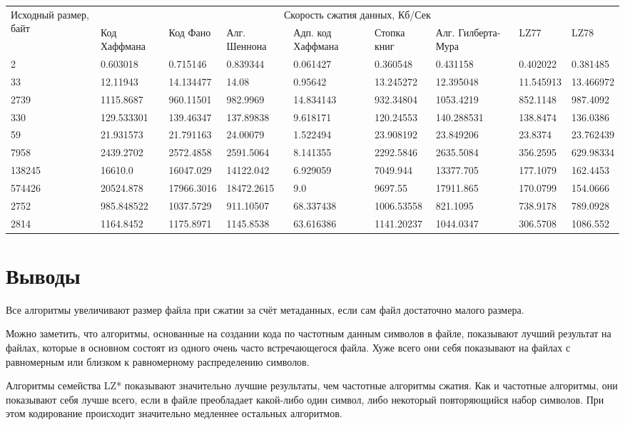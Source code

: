 \documentclass[a4paper,oneside]{article}
\theoremstyle{definition}
\begin{document}
\begin{table}[H]
  \small
  \centering
  \begin{tabular}{|p{1.5cm}|p{1.5cm}|p{1.5cm}|p{1.5cm}|p{1.5cm}|p{1.5cm}|p{1.5cm}|p{1.5cm}|p{1.5cm}|}
    \hline
    \multirow{2}{1.5cm}{Исходный размер, байт} & \multicolumn{8}{c|}{Скорость сжатия данных, Кб/Сек} \\ \cline{2-9}
    & Код Хаффмана & Код Фано & Алг. Шеннона & Адп. код Хаффмана &
    Стопка книг & Алг. Гилберта-Мура & LZ77 & LZ78 \\ \hline \hline

    2      & 0.603018 & 0.715146 & 0.839344 & 0.061427 & 0.360548 & 0.431158 & 0.402022 & 0.381485 \\ \hline
    33     & 12.11943 & 14.134477 & 14.08 & 0.95642 & 13.245272 & 12.395048 & 11.545913 & 13.466972 \\ \hline
    2739   & 1115.8687 & 960.11501 & 982.9969 & 14.834143 & 932.34804 & 1053.4219 & 852.1148 & 987.4092 \\ \hline
    330    & 129.533301 & 139.46347 & 137.89838 & 9.618171 & 120.24553 & 140.288531 & 138.8474 & 136.0386 \\ \hline
    59     & 21.931573 & 21.791163 & 24.00079 & 1.522494 & 23.908192 & 23.849206 & 23.8374 & 23.762439 \\ \hline
    7958   & 2439.2702 & 2572.4858 & 2591.5064 & 8.141355 & 2292.5846 & 2635.5084 & 356.2595 & 629.98334 \\ \hline
    138245 & 16610.0 & 16047.029 & 14122.042 & 6.929059 & 7049.944 & 13377.705 & 177.1079 & 162.4453 \\ \hline
    574426 & 20524.878 & 17966.3016 & 18472.2615 & 9.0 & 9697.55 & 17911.865 & 170.0799 & 154.0666 \\ \hline
    2752   & 985.848522 & 1037.5729 & 911.10507 & 68.337438 & 1006.53558 & 821.1095 & 738.9178 & 789.0928 \\ \hline
    2814   & 1164.8452 & 1175.8971 & 1145.8538 & 63.616386 & 1141.20237 & 1044.0347 & 306.5708 & 1086.552 \\ \hline
  \end{tabular}
\end{table}


\section{Выводы}

Все алгоритмы увеличивают размер файла при сжатии за счёт метаданных, если сам
файл достаточно малого размера.

Можно заметить, что алгоритмы, основанные на создании кода по частотным данным
символов в файле, показывают лучший результат на файлах, которые в основном
состоят из одного очень часто встречающегося файла. Хуже всего они себя
показывают на файлах с равномерным или близком к равномерному распределению
символов.

Алгоритмы семейства LZ* показывают значительно лучшие результаты, чем частотные
алгоритмы сжатия. Как и частотные алгоритмы, они показывают себя лучше всего,
если в файле преобладает какой-либо один символ, либо некоторый повторяющийся
набор символов. При этом кодирование происходит значительно медленнее остальных
алгоритмов.
\end{document}

